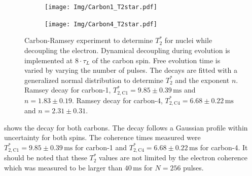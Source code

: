 \begin{figure}[htbp]
    \begin{subfigure}[t]{0.49\textwidth}\centering
        \caption{}
        \texttt{[image: Img/Carbon1\_T2star.pdf]}
        \label{fig:T2star_carbon1}
    \end{subfigure}
    \begin{subfigure}[t]{0.49\textwidth}\centering
        \caption{}
        \texttt{[image: Img/Carbon4\_T2star.pdf]}
        \label{fig:T2star_carbon4}
    \end{subfigure}
    \caption{Carbon-Ramsey experiment to determine $T_2^*$ for nuclei while decoupling the electron.
    Dynamical decoupling during evolution is implemented at $8\cdot \tau_L$ of the carbon spin. Free evolution time is varied by varying the number of pulses.
    The decays are fitted with a generalized normal distribution to determine $T_2^*$ and the exponent $n$.
     Ramsey decay for carbon-1, $T_{2,\mathrm{C1}}^* =9.85 \pm   0.39 \, \mathrm{ms}$ and $n= 1.83 \pm 0.19$.
     Ramsey decay for carbon-4,  $T_{2,\mathrm{C4}}^* =6.68 \pm   0.22 \, \mathrm{ms}$ and $n= 2.31 \pm 0.31$. } %
    \label{fig:T2star_carbon}
\end{figure}

 shows the decay for both carbons.
The decay follows a Gaussian profile within uncertainty for both spins.
The coherence times measured were $T_{2,\mathrm{C1}}^* =9.85 \pm   0.39 \, \mathrm{ms}$ for carbon-1 and $T_{2,\mathrm{C4}}^* =6.68 \pm   0.22 \, \mathrm{ms}$ for carbon-4.
It should be noted that these $T_2^*$ values are not limited by the electron coherence which was measured to be larger than $40 \,\mathrm{ms}$ for $N=256$ pulses.


